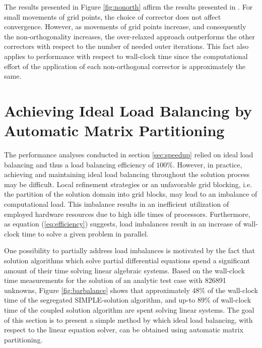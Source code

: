 The results presented in Figure \ref{fig:nonorth} affirm the results presented in \cite{jasak96}. For small movements of grid points, the choice of corrector does not affect convergence. However, as movements of grid points increase, and consequently the non-orthogonality increases, the over-relaxed approach outperforms the other correctors with respect to the number of needed outer iterations. This fact also applies to performance with respect to wall-clock time since the computational effort of the application of each non-orthogonal corrector is approximately the same.

\section{Achieving Ideal Load Balancing by Automatic Matrix Partitioning}
\label{sec:load}

The performance analyses conducted in section \ref{sec:speedup} relied on ideal load balancing and thus a load balancing efficiency of \(100\%\). However, in practice, achieving and maintaining ideal load balancing throughout the solution process may be difficult. Local refinement strategies or an unfavorable grid blocking, i.e. the partition of the solution domain into grid blocks, may lead to an imbalance of computational load. This imbalance results in an inefficient utilization of employed hardware resources due to high idle times of processors. Furthermore, as equation (\ref{eq:efficiency}) suggests, load imbalances result in an increase of wall-clock time to solve a given problem in parallel.

One possibility to partially address load imbalances is motivated by the fact that solution algorithms which solve partial differential equations spend a significant amount of their time solving linear algebraic systems. Based on the wall-clock time measurements for the solution of an analytic test case with 826891 unknowns, Figure \ref{fig:barbalance} shows that approximately \(48\%\) of the wall-clock time of the segregated SIMPLE-solution algorithm, and up-to \(89\%\) of wall-clock time of the coupled solution algorithm are spent solving linear systems. The goal of this section is to present a simple method by which ideal load balancing, with respect to the linear equation solver, can be obtained using automatic matrix partitioning.

